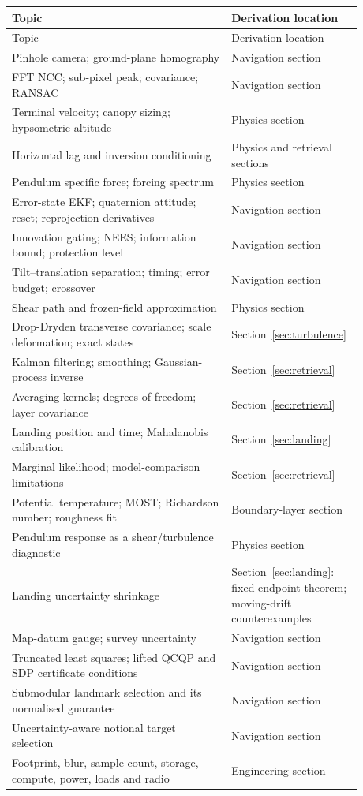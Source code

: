 \documentclass[11pt,a4paper]{article}
\numberwithin{equation}{section}
\begin{document}
\begin{longtable}{p{0.60\linewidth}p{0.28\linewidth}}
\toprule
Topic & Derivation location\\
\midrule
\endfirsthead
\toprule Topic & Derivation location\\\midrule\endhead
Pinhole camera; ground-plane homography & Navigation section\\
FFT NCC; sub-pixel peak; covariance; RANSAC & Navigation section\\
Terminal velocity; canopy sizing; hypsometric altitude & Physics section\\
Horizontal lag and inversion conditioning & Physics and retrieval sections\\
Pendulum specific force; forcing spectrum & Physics section\\
Error-state EKF; quaternion attitude; reset; reprojection derivatives & Navigation section\\
Innovation gating; NEES; information bound; protection level & Navigation section\\
Tilt--translation separation; timing; error budget; crossover & Navigation section\\
Shear path and frozen-field approximation & Physics section\\
Drop-Dryden transverse covariance; scale deformation; exact states & Section~\ref{sec:turbulence}\\
Kalman filtering; smoothing; Gaussian-process inverse & Section~\ref{sec:retrieval}\\
Averaging kernels; degrees of freedom; layer covariance & Section~\ref{sec:retrieval}\\
Landing position and time; Mahalanobis calibration & Section~\ref{sec:landing}\\
Marginal likelihood; model-comparison limitations & Section~\ref{sec:retrieval}\\
Potential temperature; MOST; Richardson number; roughness fit & Boundary-layer section\\
Pendulum response as a shear/turbulence diagnostic & Physics section\\
Landing uncertainty shrinkage & Section~\ref{sec:landing}: fixed-endpoint theorem; moving-drift counterexamples\\
Map-datum gauge; survey uncertainty & Navigation section\\
Truncated least squares; lifted QCQP and SDP certificate conditions & Navigation section\\
Submodular landmark selection and its normalised guarantee & Navigation section\\
Uncertainty-aware notional target selection & Navigation section\\
Footprint, blur, sample count, storage, compute, power, loads and radio & Engineering section\\
\bottomrule
\end{longtable}
\end{document}
